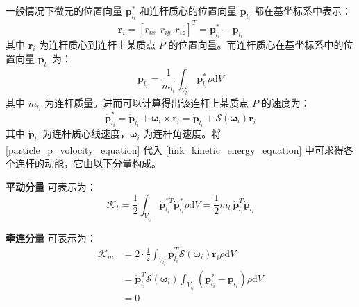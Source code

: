 \documentclass[cn,11pt,chinese,blue,bibstyle=ieeetr]{elegantbook}
\begin{document}
一般情况下微元的位置向量 ${\bm{p}}_{l_i}^{*}$ 和连杆质心的位置向量 ${\bm{p}}_{l_i}$ 都在基坐标系中表示：
\begin{equation}
	\bm{r}_i = \left[ r_{ix} \ \ r_{iy} \ \ r_{iz} \right]^T = {\bm{p}}_{l_i}^* - \bm{p}_{l_i} \nonumber
\end{equation}
其中 $\bm{r}_i$ 为连杆质心到连杆上某质点 $P$ 的位置向量。而连杆质心在基坐标系中的位置向量 $\bm{p}_{l_i}$ 为：
\begin{equation}
\bm{p}_{l_i} = \frac{1}{m_{l_i}} \int_{V_{l_i}} {{{\bm{p}}_{l_i}^*} \rho \mathrm{d}V } \nonumber
\end{equation}
其中 $m_{l_i}$ 为连杆质量。进而可以计算得出该连杆上某质点 $P$ 的速度为：
\begin{equation}\label{particle_p_volocity_equation}
{\bm{\dot p}}_{l_i}^* = \bm{\dot p}_{l_i} + \bm{\omega}_i \times \bm{r}_i = \bm{\dot p}_{l_i} + {\bm{\mathcal{S}} \left(  \bm{\omega}_i \right) \bm{r}_i}
\end{equation}
其中 $\bm{\dot p}_{l_i}$ 为连杆质心线速度，$\bm{\omega}_i$ 为连杆角速度。将 \ref{particle_p_volocity_equation} 代入 \ref{link_kinetic_energy_equation} 中可求得各个连杆的动能，它由以下分量构成。

\textbf{平动分量} 可表示为：
\begin{equation}\label{link_kinetic_energy_translational_equation}
\mathcal{K}_t = \frac{1}{2} \int_{V_{l_i}} {{{\bm{\dot p}}_{l_i}^{*T}} {{\bm{\dot p}}_{l_i}^*} \rho \mathrm{d}V} = \frac{1}{2} m_{l_i} {{\bm{\dot p}}_{l_i}^{T}} {{\bm{\dot p}}_{l_i}}
\end{equation}

\textbf{牵连分量} 可表示为：
\begin{equation}
\begin{aligned}
\mathcal{K}_m &= 2 \cdot \frac{1}{2} \int_{V_{l_i}} {{{\bm{\dot p}}_{l_i}^{T}} {{\bm{\mathcal{S}} \left(  \bm{\omega}_i \right) \bm{r}_i}} \rho \mathrm{d}V} \\ 
&= {{\bm{\dot p}}_{l_i}^{T}} \bm{\mathcal{S}} \left(  \bm{\omega}_i \right) \int_{V_{l_i}} {\left( \bm{p}_{l_i}^* - \bm{p}_{l_i} \right) \rho \mathrm{d}V} \\
&= 0 \nonumber
\end{aligned}
\end{equation}
\end{document}
